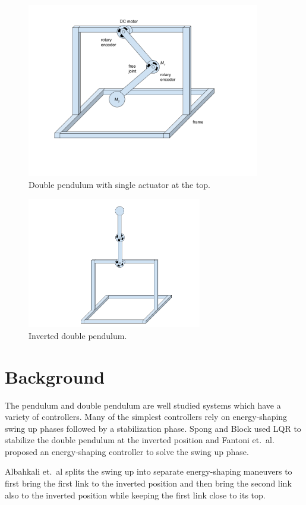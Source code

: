 \documentclass[conference]{IEEEtran}
\begin{document}
\begin{figure}[h]
	\centering
	\includegraphics[width=4in]{double_pendulum_rotary.png}
	\caption{Double pendulum with single actuator at the top.}
	\label{fig:double_pendulum}
\end{figure}

\begin{figure}[h]
	\centering
	\includegraphics[width=3in]{inverted_double_pendulum_rotary.png}
	\caption{Inverted double pendulum.}
	\label{fig:inverted_double_pendulum}
\end{figure}

\section{Background}
The pendulum and double pendulum are well studied systems which have a variety of controllers. Many of the simplest controllers rely on energy-shaping swing up phases followed by a stabilization phase. Spong and Block\cite{spong} used LQR to stabilize the double pendulum at the inverted position and Fantoni et.\ al.\cite{fantoni} proposed an energy-shaping controller to solve the swing up phase.

Albahkali et.\ al\cite{albahkali} splits the swing up into separate energy-shaping maneuvers to first bring the first link to the inverted position and then bring the second link also to the inverted position while keeping the first link close to its top.
\end{document}
